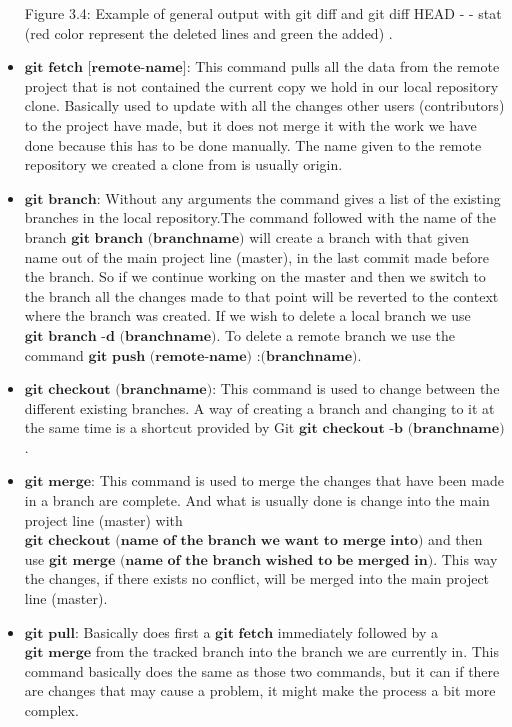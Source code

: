 \documentclass{article}
\begin{document}
\begin{itemize}
\begin{center}
Figure 3.4: Example of general output with git diff and git diff  HEAD - - stat (red color represent the deleted lines and green the added) .
\end{center}

	\item $\textbf{git fetch [remote-name]:}$ This command pulls all the data from the remote project that is not contained the current copy we hold in our local repository clone. Basically used to update with all the changes other users (contributors) to the project have made, but it does not merge it with the work we have done because this has to be done manually. The name given to the remote repository we created a clone from is usually origin.
	\item $\textbf{git branch:}$  Without any arguments the command gives a list of the existing branches in the local repository.The command followed with the name of the branch $\textbf{git branch (branchname)}$ will create a branch with that given name out of the main project line (master), in the last commit made before the branch. So if we continue working on the master and then we switch to the branch all the changes made to that point will be reverted to the context where the branch was created.  If we wish to delete a local branch we use $\textbf{git branch -d (branchname)}$. To delete a remote branch we use the command $\textbf{git push (remote-name) :(branchname)}$.
	\item $\textbf{git checkout (branchname):}$ This command is used to change between the different existing branches. A way of creating a branch and changing to it at the same time is a shortcut provided by Git $\textbf{git checkout -b (branchname)}$. 
	\item $\textbf{git merge:}$ This command is used to merge the changes that have been made in a branch are complete. And what is usually done is change into the main project line (master) with $\textbf{git checkout (name of the branch we want to merge into)}$ and then use $\textbf{git merge (name of the branch wished to be merged in)}$. This way the changes, if there exists no conflict, will be merged into the main project line (master).
	\item $\textbf{git pull:}$ Basically does first a $\textbf{git fetch}$ immediately followed by a $\textbf{git merge}$ from the tracked branch into the branch we are currently in. This command basically does the same as those two commands, but it can if there are changes that may cause a problem, it might make the process a bit more complex. 


\end{itemize}
\end{document}
